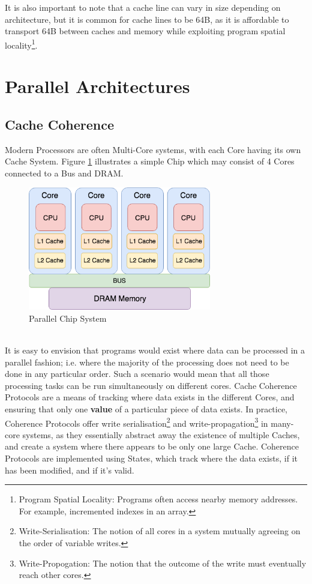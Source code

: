 \documentclass[bsc,frontabs,twoside,singlespacing,parskip,deptreport]{infthesis}     %
\begin{document}
It is also important to note that a cache line can vary in size depending on architecture, but it is common for cache lines to be 64B, as it is affordable to transport 64B between caches and memory while exploiting program spatial locality\footnote{Program Spatial Locality: Programs often access nearby memory addresses. For example, incremented indexes in an array.}.

\newpage

\section{Parallel Architectures}

\subsection{Cache Coherence}\label{cache-coherence}
Modern Processors are often Multi-Core systems, with each Core having its own Cache System. Figure \ref{fig:parallel-cpu} illustrates a simple Chip which may consist of 4 Cores connected to a Bus and DRAM. \\
\begin{figure}[!h]
    \centering
    \includegraphics[width=8cm]{Parallel.png}
    \caption{Parallel Chip System}
    \label{fig:parallel-cpu}
\end{figure} \\
It is easy to envision that programs would exist where data can be processed in a parallel fashion; i.e. where the majority of the processing does not need to be done in any particular order. Such a scenario would mean that all those processing tasks can be run simultaneously on different cores. Cache Coherence Protocols are a means of tracking where data exists in the different Cores, and ensuring that only one \textbf{value} of a particular piece of data exists. In practice, Coherence Protocols offer write serialisation\footnote{Write-Serialisation: The notion of all cores in a system mutually agreeing on the order of variable writes.} and write-propagation\footnote{Write-Propogation: The notion that the outcome of the write must eventually reach other cores.} in many-core systems, as they essentially abstract away the existence of multiple Caches, and create a system where there appears to be only one large Cache. Coherence Protocols are implemented using States, which track where the data exists, if it has been modified, and if it's valid.
\end{document}
